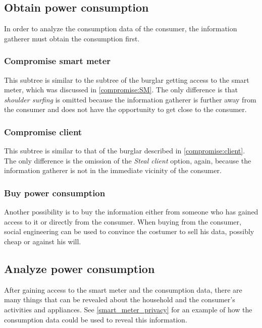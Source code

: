 \subsection{Obtain power consumption}
In order to analyze the consumption data of the consumer, the information gatherer must obtain the consumption first.

\subsubsection{Compromise smart meter}
This subtree is similar to the subtree of the burglar getting access to the smart meter, which was discussed in \cref{compromise:SM}.
The only difference is that \emph{shoulder surfing} is omitted because the information gatherer is further away from the consumer and does not have the opportunity to get close to the consumer.

\subsubsection{Compromise client}
This subtree is similar to that of the burglar described in \cref{compromise:client}.
The only difference is the omission of the \emph{Steal client} option, again, because the information gatherer is not in the immediate vicinity of the consumer.

\subsubsection{Buy power consumption}
Another possibility is to buy the information either from someone who has gained access to it or directly from the consumer.
When buying from the consumer, social engineering can be used to convince the costumer to sell his data, possibly cheap or against his will.

\subsection{Analyze power consumption}
After gaining access to the smart meter and the consumption data, there are many things that can be revealed about the household and the consumer's activities and appliances.
See \cref{smart_meter_privacy} for an example of how the consumption data could be used to reveal this information.

